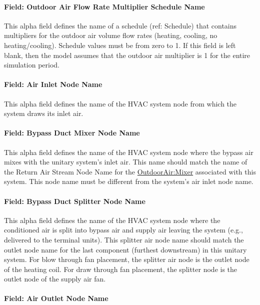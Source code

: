 \paragraph{Field: Outdoor Air Flow Rate Multiplier Schedule Name}\label{field-outdoor-air-flow-rate-multiplier-schedule-name}

This alpha field defines the name of a schedule (ref: Schedule) that contains multipliers for the outdoor air volume flow rates (heating, cooling, no heating/cooling). Schedule values must be from zero to 1. If this field is left blank, then the model assumes that the outdoor air multiplier is 1 for the entire simulation period.

\paragraph{Field: Air Inlet Node Name}\label{field-air-inlet-node-name-3-002}

This alpha field defines the name of the HVAC system node from which the system draws its inlet air.

\paragraph{Field: Bypass Duct Mixer Node Name}

This alpha field defines the name of the HVAC system node where the bypass air mixes with the unitary system's inlet air. This name should match the name of the Return Air Stream Node Name for the \hyperref[outdoorairmixer]{OutdoorAir:Mixer} associated with this system. This node name must be different from the system's air inlet node name.

\paragraph{Field: Bypass Duct Splitter Node Name}\label{field-bypass-duct-splitter-node-name}

This alpha field defines the name of the HVAC system node where the conditioned air is split into bypass air and supply air leaving the system (e.g., delivered to the terminal units). This splitter air node name should match the outlet node name for the last component (furthest downstream) in this unitary system. For blow through fan placement, the splitter air node is the outlet node of the heating coil. For draw through fan placement, the splitter node is the outlet node of the supply air fan.

\paragraph{Field: Air Outlet Node Name}\label{field-air-outlet-node-name-3-002}

